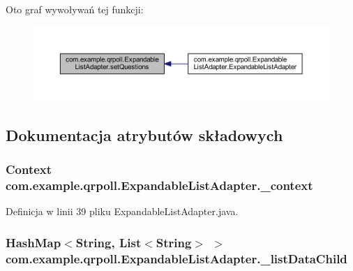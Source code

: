 Oto graf wywoływań tej funkcji\+:
\nopagebreak
\begin{figure}[H]
\begin{center}
\leavevmode
\includegraphics[width=350pt]{classcom_1_1example_1_1qrpoll_1_1_expandable_list_adapter_a8124339d7fc7169df890068e07c76e41_icgraph}
\end{center}
\end{figure}




\subsection{Dokumentacja atrybutów składowych}
\hypertarget{classcom_1_1example_1_1qrpoll_1_1_expandable_list_adapter_a7a712744eebf94bc189b44e5d04ff7da}{
\subsubsection[{\+\_\+context}]{\setlength{\rightskip}{0pt plus 5cm}Context com.\+example.\+qrpoll.\+Expandable\+List\+Adapter.\+\_\+context\hspace{0.3cm}{\ttfamily [private]}}}\label{classcom_1_1example_1_1qrpoll_1_1_expandable_list_adapter_a7a712744eebf94bc189b44e5d04ff7da}


Definicja w linii 39 pliku Expandable\+List\+Adapter.\+java.

\hypertarget{classcom_1_1example_1_1qrpoll_1_1_expandable_list_adapter_a9e3d05b47021b43ad465a1f7fa3d0ca2}{
\subsubsection[{\+\_\+list\+Data\+Child}]{\setlength{\rightskip}{0pt plus 5cm}Hash\+Map$<$String, List$<$String$>$ $>$ com.\+example.\+qrpoll.\+Expandable\+List\+Adapter.\+\_\+list\+Data\+Child\hspace{0.3cm}{\ttfamily [private]}}}\label{classcom_1_1example_1_1qrpoll_1_1_expandable_list_adapter_a9e3d05b47021b43ad465a1f7fa3d0ca2}


